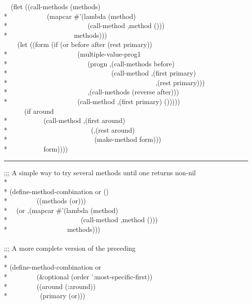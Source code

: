 \begin{defmac}
\begin{lisp}
~~(flet ((call-methods (methods) \\*
~~~~~~~~~~~(mapcar \#'(lambda (method) \\*
~~~~~~~~~~~~~~~~~~~~~~~{\Xbq}(call-method ,method ())) \\*
~~~~~~~~~~~~~~~~~~~methods))) \\
~~~~(let ((form (if (or before after (rest primary)) \\*
~~~~~~~~~~~~~~~~~~~~{\Xbq}(multiple-value-prog1 \\*
~~~~~~~~~~~~~~~~~~~~~~~(progn ,{\Xatsign}(call-methods before) \\*
~~~~~~~~~~~~~~~~~~~~~~~~~~~~~~(call-method ,(first primary) \\*
~~~~~~~~~~~~~~~~~~~~~~~~~~~~~~~~~~~~~~~~~~~,(rest primary))) \\*
~~~~~~~~~~~~~~~~~~~~~~~,{\Xatsign}(call-methods (reverse after))) \\*
~~~~~~~~~~~~~~~~~~~~{\Xbq}(call-method ,(first primary) ())))) \\
~~~~~~(if around \\*
~~~~~~~~~~{\Xbq}(call-method ,(first around) \\*
~~~~~~~~~~~~~~~~~~~~~~~~(,{\Xatsign}(rest around) \\*
~~~~~~~~~~~~~~~~~~~~~~~~~(make-method form))) \\*
~~~~~~~~~~form))))
\end{lisp}
\hrule width 0pt\relax
\begin{lisp}
;;; A simple way to try several methods until one returns non-nil \\*
\\*
(define-method-combination or () \\*
~~~~~~~~((methods (or))) \\*
~~{\Xbq}(or ,{\Xatsign}(mapcar \#'(lambda (method) \\*
~~~~~~~~~~~~~~~~~~~~~{\Xbq}(call-method ,method ())) \\*
~~~~~~~~~~~~~~~~~methods))) \\
\\
;;; A more complete version of the preceding \\*
\\*
(define-method-combination or  \\*
~~~~~~~~(\&optional (order ':most-specific-first)) \\*
~~~~~~~~((around (:around)) \\*
~~~~~~~~~(primary (or))) \\

\end{lisp}
\end{defmac}
